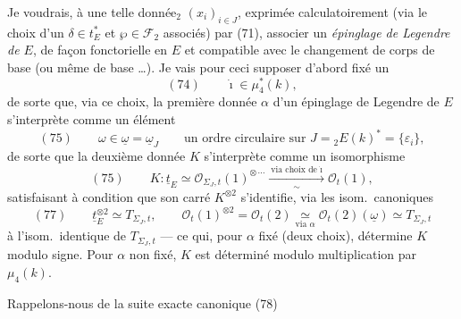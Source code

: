 \documentclass[11pt,a4paper]{article}
\begin{document}
Je voudrais, à une telle donnée$_2$ $(x_i)_{i \in J}$, exprimée calculatoirement
(via le choix d'un $\delta \in t_E^*$ et $\wp \in \mathcal{F}_2$ associés) par (71),
associer  un \emph{épinglage de Legendre de $E$}, de façon
fonctorielle en $E$ et compatible avec le changement de corps de base (ou même
de base \ldots). Je vais pour ceci supposer d'abord fixé un
\[
  (74) \qquad \dot\imath \in \mu_4^*(k) ,
\]
de sorte que, via ce choix, la première donnée $\alpha$ d'un épinglage de
Legendre de $E$ s'interprète comme un élément
\[
  (75) \qquad \omega \in \underline{\omega} = \underline{\omega}_J
  \qquad \text{un ordre circulaire sur } J = {}_2E(k)^* = \{\varepsilon_i\} ,
\]
\marginal{$\alpha = \dot\imath \wedge \omega$}
de sorte que la deuxième donnée $K$ s'interprète comme un isomorphisme
\[
  (75) \qquad K : \underline{t}_E \simeq \mathcal{O}_{\Sigma_J, t}(1)^{\otimes \,\cdots}
  \xrightarrow[\sim]{\ \text{via choix de } \dot\imath\ } \mathcal{O}_t(1) ,
\]
satisfaisant à   condition que son carré $K^{\otimes 2}$
s'identifie, via les isom.\ canoniques
\[
  (77) \qquad \underline{t}_E^{\otimes 2} \simeq T_{\Sigma_J, t} , \qquad
  \mathcal{O}_t(1)^{\otimes 2} = \mathcal{O}_t(2) \underset{\text{via } \alpha}{\simeq}
  \mathcal{O}_t(2)(\underline{\omega}) \simeq T_{\Sigma_J, t}
\]
à l'isom.\ identique de $T_{\Sigma_J, t}$ --- ce qui, pour $\alpha$ fixé (deux
choix), détermine $K$ modulo signe. Pour $\alpha$ non fixé, $K$ est déterminé
modulo multiplication par $\mu_4(k)$.

Rappelons-nous de la suite exacte canonique
(78)


\end{document}
